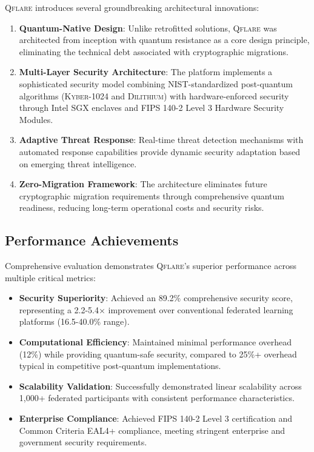\documentclass[12pt,a4paper,twoside]{book}
\newcommand{\qflare}{\textsc{Qflare}}
\newcommand{\kyber}{\textsc{Kyber}}
\newcommand{\dilithium}{\textsc{Dilithium}}
\begin{document}
\qflare{} introduces several groundbreaking architectural innovations:

\begin{enumerate}
\item \textbf{Quantum-Native Design}: Unlike retrofitted solutions, \qflare{} was architected from inception with quantum resistance as a core design principle, eliminating the technical debt associated with cryptographic migrations.

\item \textbf{Multi-Layer Security Architecture}: The platform implements a sophisticated security model combining NIST-standardized post-quantum algorithms (\kyber{}-1024 and \dilithium{}) with hardware-enforced security through Intel SGX enclaves and FIPS 140-2 Level 3 Hardware Security Modules.

\item \textbf{Adaptive Threat Response}: Real-time threat detection mechanisms with automated response capabilities provide dynamic security adaptation based on emerging threat intelligence.

\item \textbf{Zero-Migration Framework}: The architecture eliminates future cryptographic migration requirements through comprehensive quantum readiness, reducing long-term operational costs and security risks.
\end{enumerate}

\subsection{Performance Achievements}

Comprehensive evaluation demonstrates \qflare{}'s superior performance across multiple critical metrics:

\begin{itemize}
\item \textbf{Security Superiority}: Achieved an 89.2\% comprehensive security score, representing a 2.2-5.4× improvement over conventional federated learning platforms (16.5-40.0\% range).

\item \textbf{Computational Efficiency}: Maintained minimal performance overhead (12\%) while providing quantum-safe security, compared to 25\%+ overhead typical in competitive post-quantum implementations.

\item \textbf{Scalability Validation}: Successfully demonstrated linear scalability across 1,000+ federated participants with consistent performance characteristics.

\item \textbf{Enterprise Compliance}: Achieved FIPS 140-2 Level 3 certification and Common Criteria EAL4+ compliance, meeting stringent enterprise and government security requirements.
\end{itemize}
\end{document}
